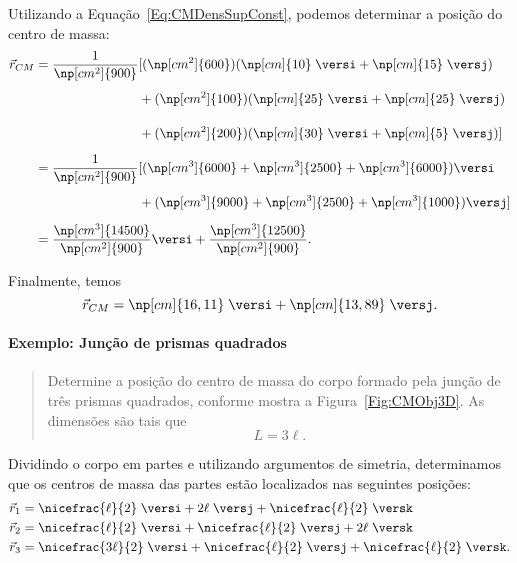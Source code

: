 \noindent{}Utilizando a Equação~\eqref{Eq:CMDensSupConst}, podemos determinar a posição do centro de massa:
\begin{align*}
    \vec{r}_{CM} &= \frac{1}{\np[cm^2]{900}} [(\np[cm^2]{600})(\np[cm]{10} \;\versi + \np[cm]{15} \;\versj) \\
    &\phantom{= \frac{1}{\np[cm^2]{900}} [}+ (\np[cm^2]{100})(\np[cm]{25} \;\versi + \np[cm]{25} \;\versj) \\
    &\phantom{= \frac{1}{\np[cm^2]{900}} [}+ (\np[cm^2]{200})(\np[cm]{30} \;\versi + \np[cm]{5} \;\versj)] \\
    &=\frac{1}{\np[cm^2]{900}}[(\np[cm^3]{6000} + \np[cm^3]{2500} + \np[cm^3]{6000})\versi \\
    &\phantom{= \frac{1}{\np[cm^2]{900}} [}+ (\np[cm^3]{9000}+ \np[cm^3]{2500} + \np[cm^3]{1000})\versj] \\
    &=\frac{\np[cm^3]{14500}}{\np[cm^2]{900}} \versi + \frac{\np[cm^3]{12500}}{\np[cm^2]{900}}.
\end{align*}

\noindent{}Finalmente, temos
\begin{equation}
    \vec{r}_{CM} = \np[cm]{16,11}\;\versi + \np[cm]{13,89}\;\versj.
\end{equation}

\paragraph{Exemplo: Junção de prismas quadrados}

\begin{quote}
    Determine a posição do centro de massa do corpo formado pela junção de três prismas quadrados, conforme mostra a Figura~\ref{Fig:CMObj3D}. As dimensões são tais que
\begin{equation}
    L = 3 \ell.
\end{equation}
\end{quote}

Dividindo o corpo em partes e utilizando argumentos de simetria, determinamos que os centros de massa das partes estão localizados nas seguintes posições:
\begin{align}
    \vec{r}_1 &= \nicefrac{\ell}{2}\;\versi + 2\ell\;\versj + \nicefrac{\ell}{2}\;\versk \\
    \vec{r}_2 &= \nicefrac{\ell}{2}\;\versi + \nicefrac{\ell}{2}\;\versj + 2\ell\;\versk \\
    \vec{r}_3 &= \nicefrac{3\ell}{2}\;\versi + \nicefrac{\ell}{2}\;\versj + \nicefrac{\ell}{2}\;\versk.
\end{align}

